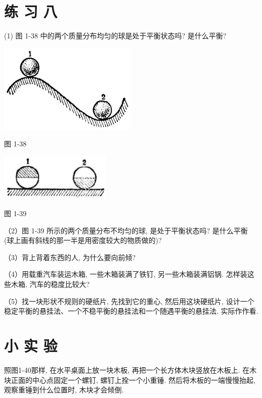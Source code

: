 \documentclass[10pt]{article}
\begin{document}
\section*{练 习 八}

(1) 图 1-38 中的两个质量分布均匀的球是处于平衡状态吗? 是什么平衡?

\begin{center}
\includegraphics[max width=0.5\textwidth]{images/01912d55-147c-70aa-b0e0-1782a122f948_50_768281.jpg}
\end{center}

图 1-38

\begin{center}
\includegraphics[max width=0.4\textwidth]{images/01912d55-147c-70aa-b0e0-1782a122f948_50_275942.jpg}
\end{center}

图 1-39

（2）图 1-39 所示的两个质量分布不均匀的球, 是处于平衡状态吗? 是什么平衡 (球上画有斜线的那一半是用密度较大的物质做的)?

（3）背上背着东西的人, 为什么要向前倾?

（4）用载重汽车装运木箱, 一些木箱装满了铁钉, 另一些木箱装满铝锅. 怎样装这些木箱, 汽车的稳度比较大?

（5）找一块形状不规则的硬纸片, 先找到它的重心, 然后用这块硬纸片, 设计一个稳定平衡的悬挂法、一个不稳平衡的悬挂法和一个随遇平衡的悬挂法. 实际作作看.

\section*{小 实 验}

照图1-40那样, 在水平桌面上放一块木板, 再把一个长方体木块竖放在木板上. 在木块正面的中心点固定一个螺钉, 螺钉上拴一个小重锤. 然后将木板的一端慢慢抬起, 观察重锤到什么位置时, 木块才会倾倒.
\end{document}
